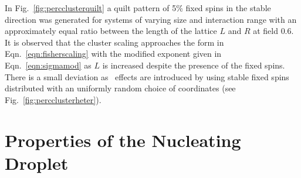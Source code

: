 In Fig.~\ref{fig:percclusterquilt} a quilt pattern of 5\% fixed spins in the stable direction was generated for systems of varying size and interaction range  with an approximately equal ratio between the length of the lattice $L$ and $R$ at  field $0.6$. It is observed that the cluster scaling approaches the form in Eqn.~\eqref{eqn:fisherscaling} with the modified exponent given in Eqn.~\eqref{eqn:sigmamod} as $L$ is increased despite the presence of the fixed spins. There is a small deviation as \het\ effects are introduced by using stable fixed spins distributed with an uniformly random choice of coordinates (see Fig.~\ref{fig:percclusterheter}).

\section{Properties of the  Nucleating Droplet}

